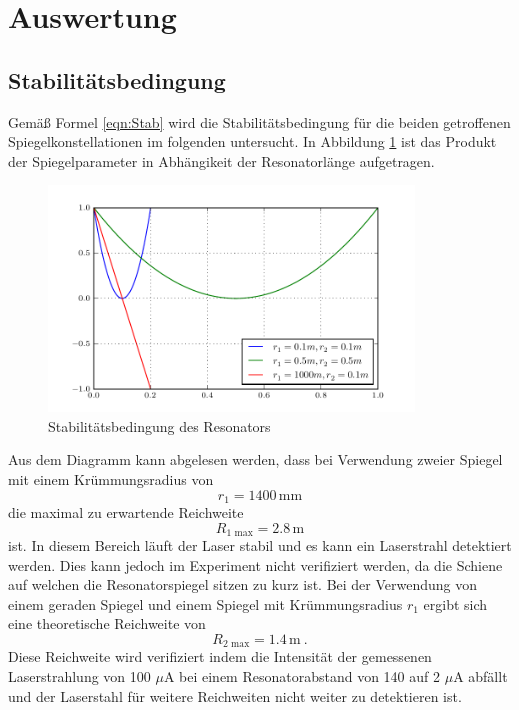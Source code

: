 \section{Auswertung}
\label{sec:Auswertung}

\subsection{Stabilitätsbedingung}
Gemäß Formel \ref{eqn:Stab} wird die Stabilitätsbedingung für die beiden getroffenen Spiegelkonstellationen im folgenden untersucht. In Abbildung \ref{fig:stabi} ist das Produkt der Spiegelparameter in Abhängikeit der Resonatorlänge aufgetragen.
\begin{figure}
  \centering
  \includegraphics[height=6cm]{Stabilisationsparameter.pdf}
  \caption{Stabilitätsbedingung des Resonators}
  \label{fig:stabi}
\end{figure}
Aus dem Diagramm kann abgelesen werden, dass bei Verwendung zweier Spiegel mit einem Krümmungsradius von
\begin{equation}
  r_1 = 1400 \, \text{mm}
  \label{eqn:rad1}
\end{equation}
die maximal zu erwartende Reichweite
\begin{equation}
  R_\text{1 max} = 2.8 \, \text{m}
  \label{eqn:rmax1}
\end{equation}
ist. In diesem Bereich läuft der Laser stabil und es kann ein Laserstrahl detektiert werden. Dies kann jedoch im Experiment nicht verifiziert werden, da die Schiene auf welchen die Resonatorspiegel sitzen zu kurz ist. Bei der Verwendung von einem geraden Spiegel und einem Spiegel mit Krümmungsradius $r_1$ ergibt sich eine theoretische Reichweite von
\begin{equation}
  R_\text{2 max} = 1.4 \, \text{m} \ .
  \label{eqn:rmax2}
\end{equation}
Diese Reichweite wird verifiziert indem die Intensität der gemessenen Laserstrahlung von 100 $\mu$A bei einem Resonatorabstand von 140 auf 2 $\mu$A abfällt und der Laserstahl für weitere Reichweiten nicht weiter zu detektieren ist.

